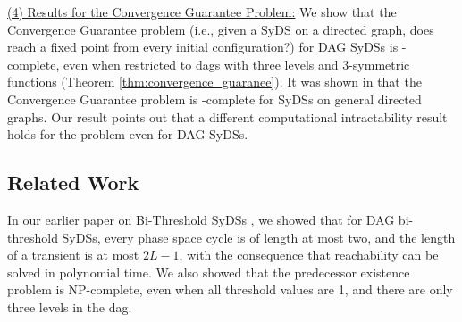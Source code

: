 \smallskip

\noindent
\underline{(4) Results for the Convergence Guarantee Problem:}
We show that
the Convergence Guarantee problem (i.e., given a SyDS \cals{} on
a directed graph, does \cals{} reach a fixed point from every
initial configuration?)  for DAG SyDSs is \cconp-complete,
even when restricted to dags with  three levels and 3-symmetric functions
(Theorem \ref{thm:convergence_guaranee}).
It was shown in \cite{Chistikov-etal-2020} that
the Convergence Guarantee problem is \cpsp-complete
for SyDSs on general directed graphs.
Our result points out that a different computational intractability
result holds for the problem even for DAG-SyDSs.

\iffalse
\item \textbf{Results for Garden of Eden, Fixed Point and Predecessor Existence
Problems:}

\begin{description}
\item{(a)} We define the concept of a local transition function being {\bf balanced},
and relate this concept to the Garden of Eden problem for DAG SyDSs.

\item{(b)} For fixed $r$, the GE existence problem for DAG SyDSs
whose local transition functions are specified as $r$-symmetric tables
can be solved in polynomial time
(Theorem \ref{thm:GardenEden-r_symmetric}).

\item{(c)} The GE existence problem for DAG SyDSs
whose local transition functions are specified as Boolean formulas
is NP-complete,
even when restricted to DAGs with two levels
(Theorem \ref{thm:GardenEden-NP}).

\item{(d)} The problem of determining whether a given DAG SyDS 
has a fixed point is NP-complete,
even when restricted to dags with two levels and maximum node degree 3
(Theorem \ref{thm:fixed_point}).

\item{(e)} The predecessor existence problem for DAG SyDSs  is NP-complete,
even when restricted to dags with two levels and maximum node degree 3
(Theorem \ref{thm:predecessor_existence}).
\end{description}
\fi

\subsection{Related Work}
\label{sse:related}

In our earlier paper on Bi-Threshold SyDSs \cite{KKM+2013}, 
we showed that for DAG bi-threshold SyDSs,
every phase space cycle is of length at most two, 
and the length of a transient is at most $2L-1$,
with the consequence that reachability can be solved in polynomial time.
We also showed that the predecessor existence problem is NP-complete, 
even when all threshold values are 1, and there are only three levels in the dag.
